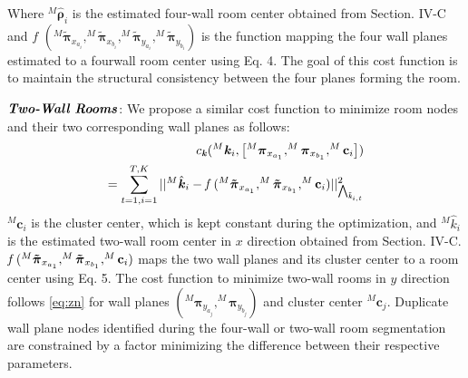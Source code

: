 \documentclass[10pt, letterpaper]{article}
\begin{document}
\begin{multicols*}{2}
\noindent %
Where $^M\mathbf{\boldsymbol{\hat{\rho}}}_{i}$ is the estimated four-wall room center obtained
from Section. IV-C and $\textit{f }(^M\boldsymbol{\tilde{\pi}}_{x_{a_{i}}}, ^M\boldsymbol{\tilde{\pi}}_{x_{b_{i}}}, ^M\boldsymbol{\tilde{\pi}}_{y_{a_{i}}}, ^M\boldsymbol{\tilde{\pi}}_{y_{b_{i}}})$ is the function mapping the four wall planes estimated to a fourwall room center using Eq. 4. The goal of this cost function is to maintain the structural consistency between the four planes forming the room.

$\textbf{\textit{Two-Wall Rooms}}$: We propose a similar cost function to
minimize room nodes and their two corresponding wall planes
as follows:
\begin{equation}
    \begin{aligned}
        {c}_{\textbf{\textit{k}}}(^M{\textbf{\textit{k}}}_{i}, \left[^M{\boldsymbol{\pi}}_{x_{a_{1}}},^M{\boldsymbol{\pi}}_{x_{b_{1}}},^M{\bf{c}}_{i}\right])\\
        =\sum_{t=1,i=1}^{T,K} ||^M{\hat{\textbf{\textit{k}}}_{i}} - \textit{f }( ^M{\boldsymbol{\tilde{\pi}}}_{x_{a_{1}}},^M{\boldsymbol{\tilde{\pi}}}_{x_{b_{1}}},^M{\bf{c}}_{i})||_{\boldsymbol{\bigwedge}_{\tilde{\textbf{\textit{k}}}_{i,t}}}^2
    \end{aligned}
    \label{eq:zn}
\end{equation}
$^M\textbf{c}_i$ is the cluster center, which is kept constant during the optimization, and $^M\hat{k}_i$ is the estimated two-wall
room center in $\textit{x}$ direction obtained from Section. IV-C. $\textit{f }( ^M{\boldsymbol{\tilde{\pi}}}_{x_{a_{1}}},^M{\boldsymbol{\tilde{\pi}}}_{x_{b_{1}}},^M{\bf{c}}_{i})$ maps the two wall planes and its
cluster center to a room center using Eq. 5. The cost function to
minimize two-wall rooms in $\textit{y}$ direction follows \cref{eq:zn}  for wall
planes $(^M\boldsymbol{{\pi}}_{y_{a_{j}}}, ^M\boldsymbol{{\pi}}_{y_{b_{j}}})$ and cluster center $^M\mathbf{c}_j$. Duplicate
wall plane nodes identified during the four-wall or two-wall
room segmentation are constrained by a factor minimizing the
difference between their respective parameters.


\end{multicols*}
\end{document}
